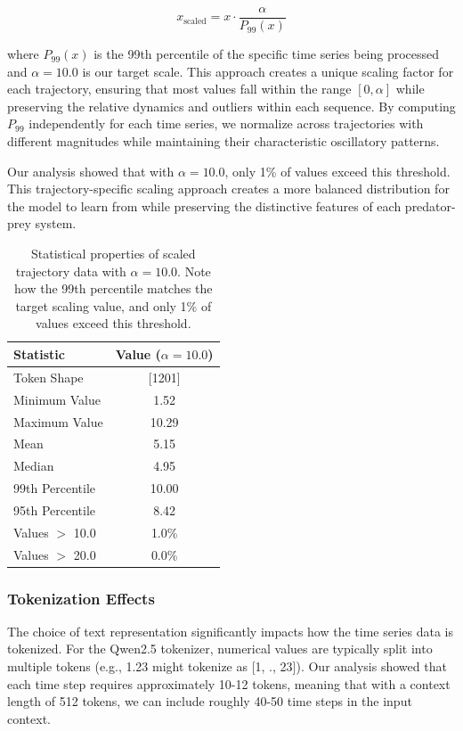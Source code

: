 \documentclass{article}
\begin{document}
\begin{equation}
x_{\text{scaled}} = x \cdot \frac{\alpha}{P_{99}(x)}
\end{equation}

where $P_{99}(x)$ is the 99th percentile of the specific time series being processed and $\alpha=10.0$ is our target scale. This approach creates a unique scaling factor for each trajectory, ensuring that most values fall within the range $[0, \alpha]$ while preserving the relative dynamics and outliers within each sequence. By computing $P_{99}$ independently for each time series, we normalize across trajectories with different magnitudes while maintaining their characteristic oscillatory patterns.

Our analysis showed that with $\alpha=10.0$, only 1\% of values exceed this threshold. This trajectory-specific scaling approach creates a more balanced distribution for the model to learn from while preserving the distinctive features of each predator-prey system.
\begin{table}[H]
    \centering
    \begin{tabular}{lc}
    \hline
    \textbf{Statistic} & \textbf{Value ($\alpha = 10.0$)} \\
    \hline
    Token Shape & [1201] \\
    Minimum Value & 1.52 \\
    Maximum Value & 10.29 \\
    Mean & 5.15 \\
    Median & 4.95 \\
    99th Percentile & 10.00 \\
    95th Percentile & 8.42 \\
    Values $>$ 10.0 & 1.0\% \\
    Values $>$ 20.0 & 0.0\% \\
    \hline
    \end{tabular}
    \caption{Statistical properties of scaled trajectory data with $\alpha = 10.0$. Note how the 99th percentile matches the target scaling value, and only 1\% of values exceed this threshold.}
    \label{tab:scaling_stats}
    \end{table}

\subsubsection*{Tokenization Effects}

The choice of text representation significantly impacts how the time series data is tokenized. For the Qwen2.5 tokenizer, numerical values are typically split into multiple tokens (e.g., 1.23 might tokenize as [1, ., 23]). Our analysis showed that each time step requires approximately 10-12 tokens, meaning that with a context length of 512 tokens, we can include roughly 40-50 time steps in the input context.
\end{document}
